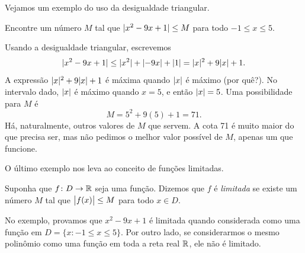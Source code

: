 Vejamos um exemplo do uso da desigualdade triangular.

\begin{example}
Encontre um número $M$ tal que $\lvert {x^2-9x+1} \rvert \leq M$ para todo $-1 \leq x \leq
5$.

Usando a desigualdade triangular, escrevemos
\begin{equation*}
\lvert {x^2-9x+1} \rvert \leq \lvert {x^2} \rvert+\lvert {-9x} \rvert+\lvert {1} \rvert
=
\lvert {x} \rvert^2+9\lvert {x} \rvert+1 .
\end{equation*}
A expressão
$\lvert {x} \rvert^2+9\lvert {x} \rvert+1$ é máxima quando $\lvert {x} \rvert$ é máximo (por quê?). No intervalo
dado, $\lvert {x} \rvert$ é máximo quando $x=5$, e então $\lvert {x} \rvert=5$. Uma
possibilidade para $M$ é
\begin{equation*}
M = 5^2+9(5)+1 = 71 .
\end{equation*}
Há, naturalmente, outros valores de $M$ que servem. A cota 71
é muito maior do que
precisa ser, mas não pedimos o melhor valor possível de $M$, apenas um que funcione.
\end{example}

O último exemplo nos leva ao conceito de funções limitadas.

\begin{defn}
Suponha que $f \colon D \to {\mathbb{R}}$ seja uma função. Dizemos que $f$ é
\emph{limitada}
se existe um número $M$
tal que $\bigl\lvert {f(x)} \bigr\rvert \leq M$ para todo $x \in D$.
\end{defn}

No exemplo, provamos que $x^2-9x+1$ é limitada quando considerada como uma
função em $D = \{ x : -1 \leq x \leq 5 \}$. Por outro lado,
se considerarmos o mesmo polinômio como uma função em toda a reta real ${\mathbb{R}}$,
ele não é limitado.

